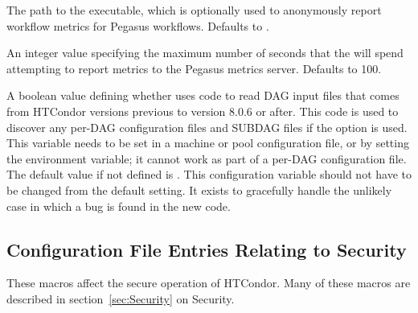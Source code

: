 \begin{description}
\label{param:DAGManPegasusReportMetrics}
\item[\Macro{DAGMAN\_PEGASUS\_REPORT\_METRICS}]
  The path to the  executable,
  which is optionally used to anonymously report workflow metrics
  for Pegasus workflows.  
  Defaults to
  .

\label{param:DAGManPegasusReportTimeout}
\item[\Macro{DAGMAN\_PEGASUS\_REPORT\_TIMEOUT}]
  An integer value specifying the maximum number of seconds that
  the  will spend attempting
  to report metrics to the Pegasus metrics server.
  Defaults to 100.

\label{param:DAGmanUseOldDagReader}
\item[\Macro{DAGMAN\_USE\_OLD\_DAG\_READER}]
  A boolean value defining whether  uses 
  code to read DAG input files that comes from HTCondor versions previous
  to version 8.0.6 or after. 
  This code is used to discover any per-DAG configuration
  files and SUBDAG files if the  option is used.
  This variable needs to be set in a machine or pool
  configuration file, or by setting the environment variable;
  it cannot work as part of a per-DAG configuration file.
  The default value if not defined is .  
  This configuration variable should not have to be changed
  from the default setting. 
  It exists to gracefully handle the unlikely case in which 
  a bug is found in the new code.

\end{description}

\subsection{\label{sec:Config-Security}Configuration File Entries
Relating to Security}

These macros affect the secure operation of HTCondor.
Many of these macros are described in
section~\ref{sec:Security} on Security.

